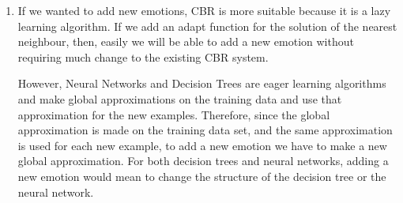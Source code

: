 \documentclass[a4paper,12pt,oneside,final]{report}
\begin{document}
\begin{enumerate}
\item If we wanted to add new emotions, CBR is more suitable because it is a lazy learning algorithm. 
    If we add an adapt function for the solution of the nearest neighbour, then, easily we will be able to add
    a new emotion without requiring much change to the existing CBR system.
    
    However, Neural Networks and Decision Trees are eager learning algorithms and make global approximations on the training data and
    use that approximation for the new examples. Therefore, since the global approximation is made on the training data set, 
    and the same approximation is used for each new example, to add a new emotion we have to make a new global approximation.
    For both decision trees and neural networks, adding a new emotion would mean to change the structure of the decision tree or the
    neural network.
\end{enumerate}




\begin{appendices}

\end{appendices}
\end{document}
